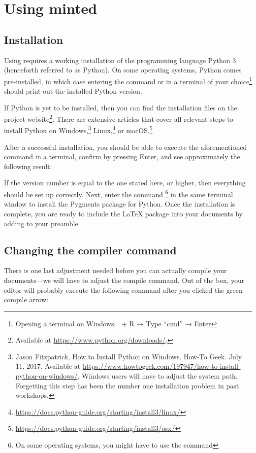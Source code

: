 \section{Using minted}

\subsection{Installation}
Using  requires a working installation of the programming language Python 3 (henceforth referred to as Python).
On some operating systems, Python comes pre-installed, in which case entering the command  or  in a terminal of your choice\footnote{Opening a terminal on Windows: \faWindows\ + R → Type \enquote{cmd} → Enter} should print out the installed Python version.

If Python is yet to be installed, then you can find the installation files on the project website\footnote{Available at \url{https://www.python.org/downloads/}.}.
There are extensive articles that cover all relevant steps to install Python on 
Windows,\footnote{Jason Fitzpatrick, How to Install Python on Windows. How-To 
Geek. July 11, 2017. Available at 
\url{https://www.howtogeek.com/197947/how-to-install-python-on-windows/}. 
Windows users will have to adjust the system path. Forgetting this step has 
been the number one installation problem in past workshops.} 
Linux,\footnote{\url{https://docs.python-guide.org/starting/install3/linux/}} 
or macOS.\footnote{\url{https://docs.python-guide.org/starting/install3/osx/}}

After a successful installation, you should be able to execute the aforementioned command in a terminal, confirm by pressing Enter, and see approximately the following result: 


\noindent If the version number is equal to the one stated here, or higher, then everything should be set up correctly.
Next, enter the command \footnote{On some operating systems, you might have to use the command } in the same terminal window to install the Pygments package for Python.
Once the installation is complete, you are ready to include the \LaTeX{} package  into your documents by adding  to your preamble.


\subsection{Changing the compiler command}
There is one last adjustment needed before you can actually compile your documents---we will have to adjust the compile command.
Out of the box, your editor will probably execute the following command after you clicked the green compile arrow:

